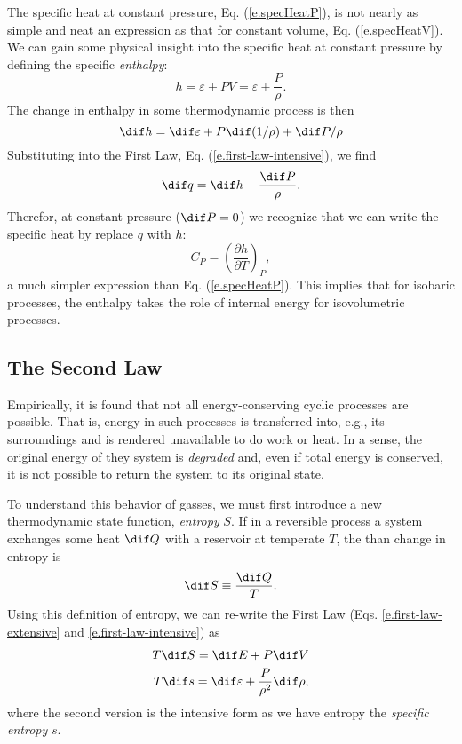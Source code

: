 The specific heat at constant pressure, Eq. (\ref{e.specHeatP}), is not nearly as simple and neat an expression as that for constant volume, Eq. (\ref{e.specHeatV}).
We can gain some physical insight into the specific heat at constant pressure by defining the specific {\it enthalpy}:
\begin{equation}
	h = \varepsilon + PV = \varepsilon + \frac{P}{\rho}.
\end{equation}
The change in enthalpy in some thermodynamic process is then
\[
	\dif h = \dif \varepsilon + P \dif(1/\rho) + \dif P / \rho
\]
Substituting into the First Law, Eq. (\ref{e.first-law-intensive}), we find
\[
	\dif q = \dif h - \frac{\dif P}{\rho}.
\]
Therefor, at constant pressure ($\dif P=0$) we recognize that we can write the specific heat by replace $q$ with $h$:
\begin{equation}
	C_P = \left(\frac{\partial h}{\partial T}\right)_P,
\end{equation}
a much simpler expression than Eq. (\ref{e.specHeatP}).
This implies that for isobaric processes, the enthalpy takes the role of internal energy for isovolumetric processes. 

\subsection{The Second Law}

Empirically, it is found that not all energy-conserving cyclic processes are possible.
That is, energy in such processes is transferred into, e.g., its surroundings and is rendered unavailable to do work or heat.
In a sense, the original energy of they system is {\it degraded} and, even if total energy is conserved, it is not possible to return the system to its original state.

To understand this behavior of gasses, we must first introduce a new thermodynamic state function, {\it entropy} $S$.
If in a reversible process a system exchanges some heat $\dif Q$ with a reservoir at temperate $T$, the than change in entropy is
\begin{equation}
	\dif S \equiv \frac{\dif Q}{T}. \label{e.difS}
\end{equation}
Using this definition of entropy, we can re-write the First Law (Eqs. \ref{e.first-law-extensive} and \ref{e.first-law-intensive}) as
\begin{eqnarray}
	T \dif S = \dif E + P \dif V \\
	T \dif s = \dif \varepsilon + \frac{P}{\rho^2}\dif\rho,
\end{eqnarray}
where the second version is the intensive form as we have entropy the {\it specific entropy} $s$.

